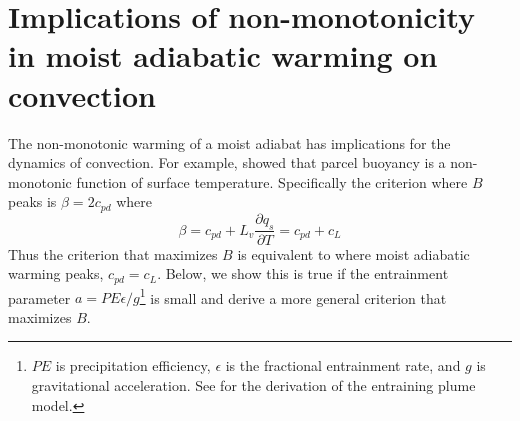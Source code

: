 \documentclass[draft]{ametsocV6.1}
\begin{document}
\section{Implications of non-monotonicity in moist adiabatic warming on convection}
The non-monotonic warming of a moist adiabat has implications for the dynamics of convection. For example, \cite{romps2016} showed that parcel buoyancy is a non-monotonic function of surface temperature. Specifically the criterion where $B$ peaks is $\beta = 2c_{pd}$ where
\begin{equation}
\beta = c_{pd} + L_v\frac{\partial q_s}{\partial T} = c_{pd} + c_L
\end{equation}
Thus the criterion that maximizes $B$ is equivalent to where moist adiabatic warming peaks, $c_{pd} = c_L$. Below, we show this is true if the entrainment parameter $a = PE \epsilon / g$\footnote{$PE$ is precipitation efficiency, $\epsilon$ is the fractional entrainment rate, and $g$ is gravitational acceleration. See \cite{romps2016} for the derivation of the entraining plume model.} is small and derive a more general criterion that maximizes $B$. 
\end{document}
